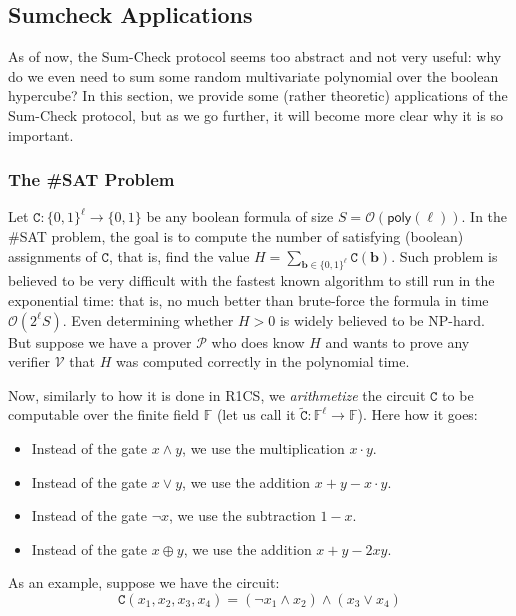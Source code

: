 \subsection{Sumcheck Applications}

As of now, the Sum-Check protocol seems too abstract and not very useful: why do
we even need to sum some random multivariate polynomial over the boolean
hypercube? In this section, we provide some (rather theoretic) applications of
the Sum-Check protocol, but as we go further, it will become more clear why it
is so important.

\subsubsection{The \#SAT Problem}

Let $\mathtt{C}: \{0,1\}^{\ell} \to \{0,1\}$ be any boolean formula of size $S =
\mathcal{O}(\mathsf{poly}(\ell))$. In the \#SAT problem, the goal is to compute
the number of satisfying (boolean) assignments of $\mathtt{C}$, that is, find
the value $H = \sum_{\boldsymbol{b} \in
\{0,1\}^{\ell}}\mathtt{C}(\boldsymbol{b})$. Such problem is believed to be very
difficult with the fastest known algorithm to still run in the exponential time:
that is, no much better than brute-force the formula in time
$\mathcal{O}(2^{\ell}S)$. Even determining whether $H > 0$ is widely believed to
be NP-hard. But suppose we have a prover $\mathcal{P}$ who does know $H$ and
wants to prove any verifier $\mathcal{V}$ that $H$ was computed correctly in the
polynomial time.

Now, similarly to how it is done in R1CS, we \textit{arithmetize} the circuit
$\mathtt{C}$ to be computable over the finite field $\mathbb{F}$ (let us call it
$\widetilde{\mathtt{C}}: \mathbb{F}^{\ell} \to \mathbb{F}$). Here how it goes:
\begin{itemize}
    \item Instead of the gate $x \wedge y$, we use the multiplication $x \cdot y$.
    \item Instead of the gate $x \vee y$, we use the addition $x + y - x \cdot y$.
    \item Instead of the gate $\neg x$, we use the subtraction $1 - x$.
    \item Instead of the gate $x \oplus y$, we use the addition $x + y - 2xy$.
\end{itemize}

As an example, suppose we have the circuit:
\begin{equation*}
    \mathtt{C}(x_1,x_2,x_3,x_4) = (\neg x_1 \wedge x_2) \wedge (x_3 \vee x_4)
\end{equation*}

